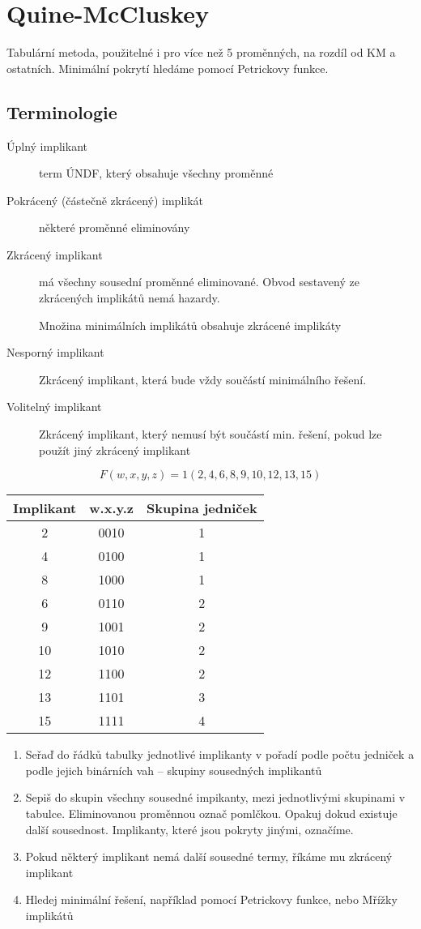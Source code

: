 \documentclass[a4wide]{report}
\begin{document}
\section{Quine-McCluskey}

Tabulární metoda, použitelné i pro více než 5 proměnných, na rozdíl od KM a ostatních. Minimální pokrytí hledáme pomocí Petrickovy funkce.

\subsection{Terminologie}
\begin{description}
	\item[Úplný implikant] term ÚNDF, který obsahuje všechny proměnné
	\item[Pokrácený (částečně zkrácený) implikát] některé proměnné eliminovány
	\item[Zkrácený implikant] má všechny sousední proměnné eliminované. Obvod sestavený ze zkrácených implikátů nemá hazardy.
	\item[] Množina minimálních implikátů obsahuje zkrácené implikáty
	\item[Nesporný implikant] Zkrácený implikant, která bude vždy součástí minimálního řešení.
	\item[Volitelný implikant] Zkrácený implikant, který nemusí být součástí min. řešení, pokud lze použít jiný zkrácený implikant
\end{description}

$$F(w,x,y,z) = 1(2,4,6,8,9,10,12,13,15)$$
\begin{tabular}{ | c | c | c |}
	\hline
	Implikant & w.x.y.z & Skupina jedniček \\ \hline
	2	& 0010	& 1 \\ \hline
	4	& 0100	& 1 \\ \hline
	8	& 1000	& 1 \\ \hline
	6	& 0110	& 2 \\ \hline
	9	& 1001	& 2 \\ \hline
	10	& 1010	& 2 \\ \hline
	12	& 1100	& 2 \\ \hline
	13	& 1101	& 3 \\ \hline
	15	& 1111	& 4 \\ \hline
\end{tabular}

\begin{enumerate}
	\item Seřaď do řádků tabulky jednotlivé implikanty v pořadí podle počtu jedniček a podle jejich binárních vah -- skupiny sousedných implikantů
	\item Sepiš do skupin všechny sousedné impikanty, mezi jednotlivými skupinami v tabulce. Eliminovanou proměnnou označ pomlčkou. Opakuj dokud existuje další sousednost. Implikanty, které jsou pokryty jinými, označíme.
	\item Pokud některý implikant nemá další sousedné termy, říkáme mu zkrácený implikant
	\item Hledej minimální řešení, například pomocí Petrickovy funkce, nebo Mřížky implikátů
\end{enumerate}
\end{document}
